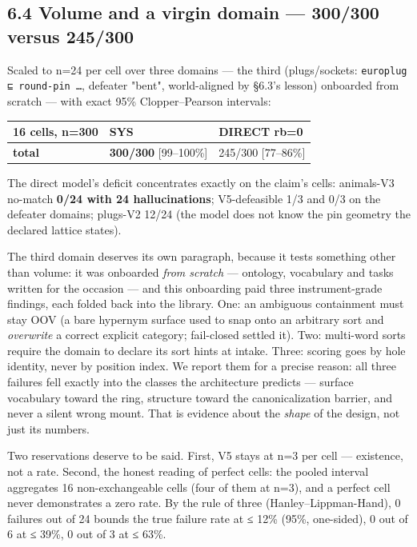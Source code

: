 \documentclass[11pt]{article}
\begin{document}
\subsection*{6.4 Volume and a virgin domain — 300/300 versus 245/300}

Scaled to n=24 per cell over three domains — the third (plugs/sockets: \texttt{europlug ⊑ round-pin …}, defeater "bent", world-aligned by §6.3's lesson) onboarded from scratch — with exact 95\% Clopper–Pearson intervals:

\begin{center}\small\begin{tabular}{lll}\toprule
16 cells, n=300 & SYS & DIRECT rb=0 \\ \midrule
\textbf{total} & \textbf{300/300} [99–100\%] & 245/300 [77–86\%] \\
\bottomrule\end{tabular}\end{center}

The direct model's deficit concentrates exactly on the claim's cells: animals-V3 no-match \textbf{0/24 with 24 hallucinations}; V5-defeasible 1/3 and 0/3 on the defeater domains; plugs-V2 12/24 (the model does not know the pin geometry the declared lattice states).

The third domain deserves its own paragraph, because it tests something other than volume: it was onboarded \emph{from scratch} — ontology, vocabulary and tasks written for the occasion — and this onboarding paid three instrument-grade findings, each folded back into the library. One: an ambiguous containment must stay OOV (a bare hypernym surface used to snap onto an arbitrary sort and \emph{overwrite} a correct explicit category; fail-closed settled it). Two: multi-word sorts require the domain to declare its sort hints at intake. Three: scoring goes by hole identity, never by position index. We report them for a precise reason: all three failures fell exactly into the classes the architecture predicts — surface vocabulary toward the ring, structure toward the canonicalization barrier, and never a silent wrong mount. That is evidence about the \emph{shape} of the design, not just its numbers.

Two reservations deserve to be said. First, V5 stays at n=3 per cell — existence, not a rate. Second, the honest reading of perfect cells: the pooled interval aggregates 16 non-exchangeable cells (four of them at n=3), and a perfect cell never demonstrates a zero rate. By the rule of three (Hanley–Lippman-Hand), 0 failures out of 24 bounds the true failure rate at ≤ 12\% (95\%, one-sided), 0 out of 6 at ≤ 39\%, 0 out of 3 at ≤ 63\%.
\end{document}
